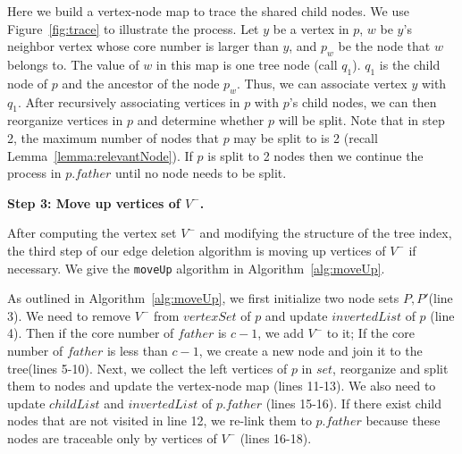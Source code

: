 Here we build a vertex-node map to trace the shared child nodes. We use Figure~\ref{fig:trace} to illustrate the process. Let $y$ be a vertex in $p$, $w$ be $y$'s neighbor vertex whose core number is larger than $y$, and $p_w$ be the node that $w$ belongs to. The value of $w$ in this map is one tree node (call $q_1$). $q_1$ is the child node of $p$ and the ancestor of the node $p_w$. Thus, we can associate vertex $y$ with $q_1$. After recursively associating vertices in $p$ with $p$'s child nodes, we can then reorganize vertices in $p$ and determine whether $p$ will be split. Note that in step 2, the maximum number of nodes that $p$ may be split to is 2 (recall Lemma~\ref{lemma:relevantNode}). If $p$ is split to 2 nodes then we continue the process in $p.father$ until no node needs to be split. 



\textbf{Step 3: Move up vertices of $V^-$.}

After computing the vertex set $V^-$ and modifying the structure of the tree index, the third step of our edge deletion algorithm is moving up vertices of $V^-$ if necessary. We give the {\tt moveUp} algorithm in Algorithm~\ref{alg:moveUp}.

As outlined in Algorithm~\ref{alg:moveUp}, we first initialize two node sets $P,P'$(line 3). We need to remove $V^-$ from $vertexSet$ of $p$ and update $invertedList$ of $p$ (line 4). Then if the core number of $father$ is $c-1$, we add $V^-$ to it; If the core number of $father$ is less than $c-1$, we create a new node and join it to the tree(lines 5-10). Next, we collect the left vertices of $p$ in $set$, reorganize and split them to nodes and update the vertex-node map (lines 11-13). We also need to update $childList$ and $invertedList$ of $p.father$ (lines 15-16). If there exist child nodes that are not visited in line 12, we re-link them to $p.father$ because these nodes are traceable only by vertices of $V^-$ (lines 16-18).





